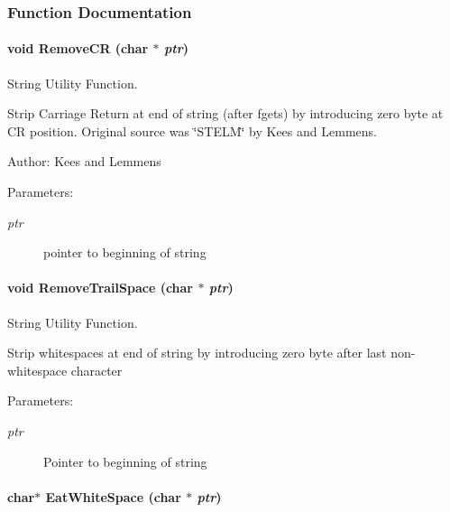 \subsubsection{Function Documentation}
\hypertarget{group__utilities_g869ea1081375ada22168696db002bc58}{
\paragraph[{RemoveCR}]{\setlength{\rightskip}{0pt plus 5cm}void RemoveCR (char $\ast$ {\em ptr})}\hfill}
\label{group__utilities_g869ea1081375ada22168696db002bc58}


String Utility Function. 

Strip Carriage Return at end of string (after fgets) by introducing zero byte at CR position. Original source was \char`\"{}STELM\char`\"{} by Kees and Lemmens.

\begin{Desc}
\item[Author:]Kees and Lemmens\end{Desc}
\begin{Desc}
\item[Parameters:]
\begin{description}
\item[{\em ptr}]pointer to beginning of string \end{description}
\end{Desc}
\hypertarget{group__utilities_gbb7b78ca5a077167e24637bba539eea1}{
\paragraph[{RemoveTrailSpace}]{\setlength{\rightskip}{0pt plus 5cm}void RemoveTrailSpace (char $\ast$ {\em ptr})}\hfill}
\label{group__utilities_gbb7b78ca5a077167e24637bba539eea1}


String Utility Function. 

Strip whitespaces at end of string by introducing zero byte after last non-whitespace character

\begin{Desc}
\item[Parameters:]
\begin{description}
\item[{\em ptr}]Pointer to beginning of string \end{description}
\end{Desc}
\hypertarget{group__utilities_gb6760d18c7c13f3c80d365abcb6a46b3}{
\paragraph[{EatWhiteSpace}]{\setlength{\rightskip}{0pt plus 5cm}char$\ast$ EatWhiteSpace (char $\ast$ {\em ptr})}\hfill}
\label{group__utilities_gb6760d18c7c13f3c80d365abcb6a46b3}


